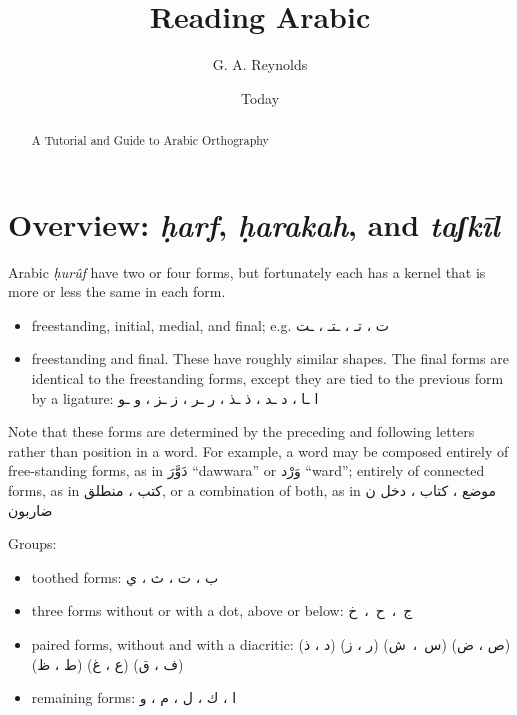 \documentclass[11pt]{article}
\begin{document}
\title{Reading Arabic}
\author{G. A. Reynolds}
\date{Today}
\maketitle

\begin{abstract}
A Tutorial and Guide to Arabic Orthography
\end{abstract}

\tableofcontents

\section{Overview: \textit{ḥarf}, \textit{ḥarakah}, and \textit{taʃkīl}}

Arabic \textit{ḥurûf} have two or four forms, but fortunately each has
a kernel that is more or less the same in each form.

\begin{itemize}
\item freestanding, initial, medial, and final; e.g. \textarabic{ت ، تـ
  ، ـتـ ، ـت}
\item freestanding and final. These have roughly similar shapes. The
  final forms are identical to the freestanding forms, except they are
  tied to the previous form by a ligature:
  \textarabic{ا ـا ، د ـد ، ذ ـذ ، ر ـر ، ز ـز ، و ـو}
\end{itemize}

Note that these forms are determined by the preceding and following
letters rather than position in a word. For example, a word may be
composed entirely of free-standing forms, as in \textarabic{دَوَّرَ}
``dawwara'' or \textarabic{وَرْد} ``ward''; entirely of connected forms,
as in \textarabic{كتب ، منطلق}, or a combination of both, as in
\textarabic{موضع ، كتاب ، دخل ن ضاربون}

Groups:

\begin{itemize}
\item toothed forms: \textarabic{ب ، ت ، ث ، ي}
\item three forms without or with a dot, above or below: \textarabic{ج~،~ح~،~خ}
\item paired forms, without and with a diacritic:
  \textarabic{(د ، ذ) (ر ، ز) (س~،~ش) (ص ، ض) (ط ، ظ) (ع ، غ) (ف ، ق)}
\item remaining forms: \textarabic{ا ، ك ، ل ، م ، و}
\end{itemize}
\end{document}
